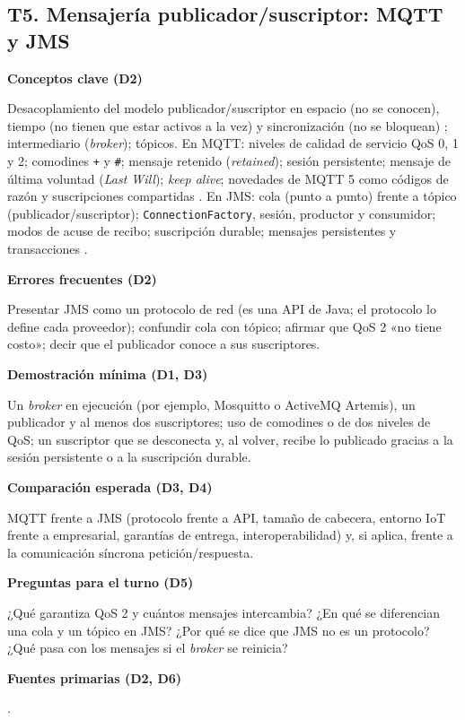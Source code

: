 \documentclass[11pt,a4paper]{article}
\newcommand{\campo}[1]{\par\smallskip\textbf{\color{uteqBlue}#1}\par}
\begin{document}
\subsection{T5. Mensajería publicador/suscriptor: MQTT y JMS}
\begin{fichaBox}[title={Ficha T5 --- MQTT y JMS (Jakarta Messaging)}]
	\campo{Conceptos clave (D2)}
	Desacoplamiento del modelo publicador/suscriptor en espacio (no se conocen), tiempo (no tienen que estar activos a la vez) y sincronización (no se bloquean) \cite{eugster2003many}; intermediario (\emph{broker}); tópicos. En MQTT: niveles de calidad de servicio QoS 0, 1 y 2; comodines \texttt{+} y \texttt{\#}; mensaje retenido (\emph{retained}); sesión persistente; mensaje de última voluntad (\emph{Last Will}); \emph{keep alive}; novedades de MQTT 5 como códigos de razón y suscripciones compartidas \cite{oasis2019mqtt,mishra2020mqtt}. En JMS: cola (punto a punto) frente a tópico (publicador/suscriptor); \texttt{ConnectionFactory}, sesión, productor y consumidor; modos de acuse de recibo; suscripción durable; mensajes persistentes y transacciones \cite{jakarta2022messaging}.
	\campo{Errores frecuentes (D2)}
	Presentar JMS como un protocolo de red (es una API de Java; el protocolo lo define cada proveedor); confundir cola con tópico; afirmar que QoS 2 «no tiene costo»; decir que el publicador conoce a sus suscriptores.
	\campo{Demostración mínima (D1, D3)}
	Un \emph{broker} en ejecución (por ejemplo, Mosquitto o ActiveMQ Artemis), un publicador y al menos dos suscriptores; uso de comodines o de dos niveles de QoS; un suscriptor que se desconecta y, al volver, recibe lo publicado gracias a la sesión persistente o a la suscripción durable.
	\campo{Comparación esperada (D3, D4)}
	MQTT frente a JMS (protocolo frente a API, tamaño de cabecera, entorno IoT frente a empresarial, garantías de entrega, interoperabilidad) y, si aplica, frente a la comunicación síncrona petición/respuesta.
	\campo{Preguntas para el turno (D5)}
	¿Qué garantiza QoS 2 y cuántos mensajes intercambia? ¿En qué se diferencian una cola y un tópico en JMS? ¿Por qué se dice que JMS no es un protocolo? ¿Qué pasa con los mensajes si el \emph{broker} se reinicia?
	\campo{Fuentes primarias (D2, D6)}
	\cite{oasis2019mqtt,jakarta2022messaging,eugster2003many,mishra2020mqtt}.
\end{fichaBox}

\end{document}
